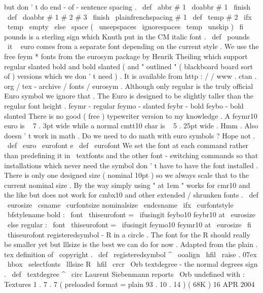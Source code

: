 {but
don
'
t
do
end
-
of
-
sentence
spacing
.
%
\
def
\
abbr
#
1
{
\
doabbr
#
1
\
finish
}
\
def
\
doabbr
#
1
#
2
#
3
\
finish
{
%
{
\
plainfrenchspacing
#
1
}
%
\
def
\
temp
{
#
2
}
%
\
ifx
\
temp
\
empty
\
else
\
space
(
{
\
unsepspaces
\
ignorespaces
\
temp
\
unskip
}
)
%
\
fi
}
%
pounds
{
}
is
a
sterling
sign
which
Knuth
put
in
the
CM
italic
font
.
%
\
def
\
pounds
{
{
\
it
\
}
}
%
euro
{
}
comes
from
a
separate
font
depending
on
the
current
style
.
%
We
use
the
free
feym
*
fonts
from
the
eurosym
package
by
Henrik
%
Theiling
which
support
regular
slanted
bold
and
bold
slanted
(
and
%
"
outlined
"
(
blackboard
board
sort
of
)
versions
which
we
don
'
t
need
)
.
%
It
is
available
from
http
:
/
/
www
.
ctan
.
org
/
tex
-
archive
/
fonts
/
eurosym
.
%
%
Although
only
regular
is
the
truly
official
Euro
symbol
we
ignore
%
that
.
The
Euro
is
designed
to
be
slightly
taller
than
the
regular
%
font
height
.
%
%
feymr
-
regular
%
feymo
-
slanted
%
feybr
-
bold
%
feybo
-
bold
slanted
%
%
There
is
no
good
(
free
)
typewriter
version
to
my
knowledge
.
%
A
feymr10
euro
is
~
7
.
3pt
wide
while
a
normal
cmtt10
char
is
~
5
.
25pt
wide
.
%
Hmm
.
%
%
Also
doesn
'
t
work
in
math
.
Do
we
need
to
do
math
with
euro
symbols
?
%
Hope
not
.
%
%
\
def
\
euro
{
{
\
eurofont
e
}
}
\
def
\
eurofont
{
%
%
We
set
the
font
at
each
command
rather
than
predefining
it
in
%
\
textfonts
and
the
other
font
-
switching
commands
so
that
%
installations
which
never
need
the
symbol
don
'
t
have
to
have
the
%
font
installed
.
%
%
There
is
only
one
designed
size
(
nominal
10pt
)
so
we
always
scale
%
that
to
the
current
nominal
size
.
%
%
By
the
way
simply
using
"
at
1em
"
works
for
cmr10
and
the
like
but
%
does
not
work
for
cmbx10
and
other
extended
/
shrunken
fonts
.
%
\
def
\
eurosize
{
\
csname
\
curfontsize
nominalsize
\
endcsname
}
%
%
\
ifx
\
curfontstyle
\
bfstylename
%
bold
:
\
font
\
thiseurofont
=
\
ifusingit
{
feybo10
}
{
feybr10
}
at
\
eurosize
\
else
%
regular
:
\
font
\
thiseurofont
=
\
ifusingit
{
feymo10
}
{
feymr10
}
at
\
eurosize
\
fi
\
thiseurofont
}
%
registeredsymbol
-
R
in
a
circle
.
The
font
for
the
R
should
really
%
be
smaller
yet
but
lllsize
is
the
best
we
can
do
for
now
.
%
Adapted
from
the
plain
.
tex
definition
of
\
copyright
.
%
\
def
\
registeredsymbol
{
%
^
{
{
\
ooalign
{
\
hfil
\
raise
.
07ex
\
hbox
{
\
selectfonts
\
lllsize
R
}
%
\
hfil
\
crcr
\
Orb
}
}
%
}
%
}
%
textdegree
-
the
normal
degrees
sign
.
%
\
def
\
textdegree
{
^
\
circ
}
%
Laurent
Siebenmann
reports
\
Orb
undefined
with
:
%
Textures
1
.
7
.
7
(
preloaded
format
=
plain
93
.
10
.
14
)
(
68K
)
16
APR
2004
}
